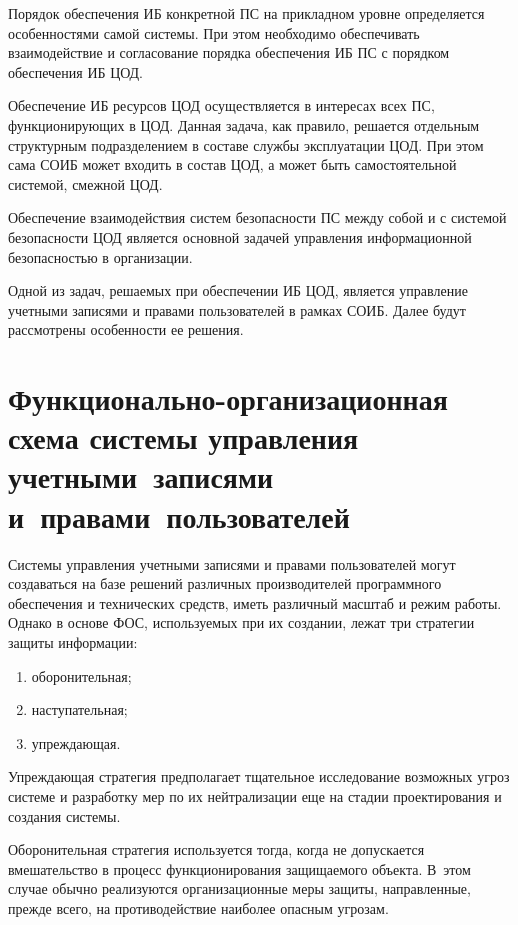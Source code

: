 \begin{multicols}{2}
       Порядок обеспечения ИБ конкретной ПС на прикладном уровне определяется 
особенностями самой сис\-те\-мы. При этом необходимо обеспечивать взаимодействие и 
согласование порядка обеспечения ИБ ПС с порядком обеспечения ИБ\linebreak
 ЦОД.
       
       Обеспечение ИБ ресурсов ЦОД осуществляется в интересах всех ПС, 
функционирующих в ЦОД. Данная задача, как правило, решается отдельным структурным 
подразделением в составе службы эксплуатации ЦОД. При этом сама СОИБ может 
входить в состав ЦОД, а может быть самостоятельной сис\-те\-мой, смежной ЦОД. 
       
       Обеспечение взаимодействия сис\-тем безопасности ПС между собой и с сис\-те\-мой 
безопасности ЦОД является основной задачей управления информационной 
безопасностью в организации.
       
       Одной из задач, решаемых при обеспечении ИБ ЦОД, является управление 
учетными записями и правами пользователей в рамках СОИБ. Далее будут рассмотрены 
особенности ее решения.

\section{Функционально-организационная схема 
системы управления учетными~записями и~правами~пользователей}
       
       Системы управления учетными записями и правами пользователей могут 
создаваться на базе решений различных производителей программного обеспечения и 
технических средств, иметь различный масштаб и режим работы. Однако в основе 
ФОС, используемых при их создании, лежат три стратегии защиты информации:
       \begin{enumerate}[(1)]
\item оборонительная;
\item наступательная;
\item упреждающая.
\end{enumerate}

       Упреждающая стратегия предполагает тщательное исследование возможных 
угроз сис\-те\-ме и разработку мер по их нейтрализации еще на стадии проектирования и 
создания сис\-темы.
       
       Оборонительная стратегия используется тогда, когда не допускается 
вмешательство в процесс функционирования защищаемого объекта. В~этом случае 
обычно реализуются организационные меры защиты, направленные, прежде всего, на 
противодействие наиболее опасным угрозам.
       

\end{multicols}
